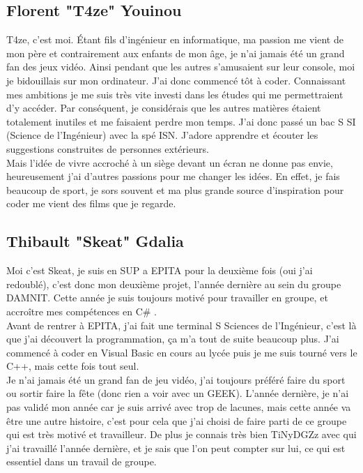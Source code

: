 \documentclass [11pt]{report}
\begin{document}
		\subsection {Florent "T4ze" Youinou}
			T4ze, c’est moi. \'Etant fils d’ingénieur en informatique, ma passion me vient de mon père et contrairement aux enfants de mon âge, je n’ai jamais été un grand fan des jeux vidéo. Ainsi pendant que les autres s’amusaient sur leur console, moi je bidouillais sur mon ordinateur. J’ai donc commencé tôt à coder. Connaissant mes ambitions je me suis très vite investi dans les études qui me permettraient d’y accéder. Par conséquent, je considérais que les autres matières étaient totalement inutiles et me faisaient perdre mon temps. J’ai donc passé un bac S SI (Science de l’Ingénieur) avec la spé ISN. J’adore apprendre et écouter les suggestions construites de personnes extérieurs.\\
			\indent Mais l’idée de vivre accroché à un siège devant un écran ne donne pas envie, heureusement j’ai d’autres passions pour me changer les idées. En effet, je fais beaucoup de sport, je sors souvent et ma plus grande source d’inspiration pour coder me vient des films que je regarde.\\
\vspace{10mm}

	
		
		
		\subsection {Thibault "Skeat" Gdalia}

			Moi c'est Skeat, je suis en SUP a EPITA pour la deuxi\`eme fois (oui j'ai redoubl\'e),  c'est donc mon deuxi\`eme projet, l'ann\'ee derni\`ere au sein du groupe DAMNIT. Cette ann\'ee je suis toujours motiv\'e pour travailler en groupe, et accro\^itre mes comp\'etences en C\# . \\
			 \indent  Avant de rentrer à EPITA, j'ai fait une terminal S Sciences de l'Ing\'enieur, c'est là que j'ai découvert la programmation, ça m'a tout de suite beaucoup plus. J'ai commenc\'e à coder en Visual Basic en cours au lyc\'ee puis je me suis tourn\'e vers le C++, mais cette fois tout seul.\\
		 	\indent Je n'ai jamais \'et\'e un grand fan de jeu vid\'eo, j'ai toujours pr\'ef\'er\'e faire du sport ou sortir faire la f\^ete (donc rien a voir avec un GEEK). L'ann\'ee derni\`ere, je n'ai pas valid\'e mon ann\'ee car je suis arriv\'e avec trop de lacunes, mais cette ann\'ee va \^etre une autre histoire, c'est pour cela que j'ai choisi  			de faire parti de ce groupe qui est tr\`es motiv\'e et travailleur. De plus je connais tr\`es bien TiNyDGZz avec qui j'ai travaill\'e l'ann\'ee derni\`ere, et je sais que l'on peut compter sur lui, ce qui est essentiel dans un travail de groupe.\\\vspace{10mm}
	
\end{document}
